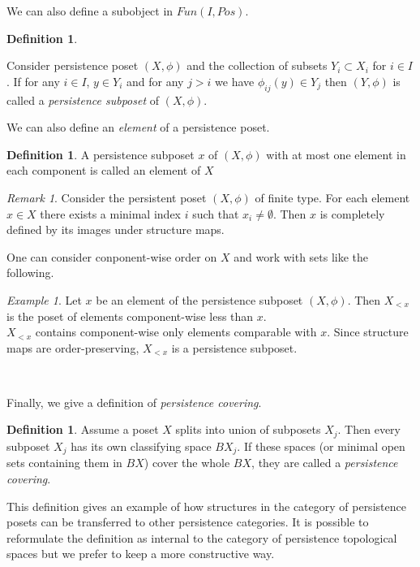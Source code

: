 \documentclass[english,12pt]{article}
\newcounter{stmcounter}[section]
\numberwithin{equation}{section}
\theoremstyle{definition}
\newtheorem{definition}[stmcounter]{Definition}
\theoremstyle{remark}
\newtheorem{remark}[stmcounter]{Remark}
\newtheorem{example}[stmcounter]{Example}
\newcommand{\define}[1]{{\textit{#1}}}
\begin{document}
We can also define a subobject in $Fun(I, Pos)$.

\begin{definition} ~ \par
  Consider persistence poset $(X,\phi)$ and the collection of subsets $Y_i \subset X_i$ for $i \in I$.
  If for any $i \in I$, $y \in Y_i$ and for any $j>i$ we have $\phi_{ij}(y) \in Y_j$ then $(Y,\phi)$ is called a \define{persistence subposet} of $(X,\phi)$.
\end{definition}

We can also define an \define{element} of a persistence poset.
\begin{definition}
  A persistence subposet $x$ of $(X,\phi)$ with at most one element in each component is called an element of $X$
\end{definition}

\begin{remark}
  Consider the persistent poset $(X, \phi)$ of finite type. For each element $x \in X$ there exists a minimal index $i$ such that $x_i \neq \emptyset$. Then $x$ is completely defined by its images under structure maps.
\end{remark}

One can consider conponent-wise order on $X$ and work with sets like the following.
\begin{example}
  Let $x$ be an element of the persistence subposet $(X, \phi)$. Then $X_{<x}$ is the poset of elements component-wise less than $x$.\\

  $X_{<x}$ contains component-wise only elements comparable with $x$. Since structure maps are order-preserving, $X_{<x}$ is a persistence subposet.
\end{example} ~ \par

Finally, we give a definition of \define{persistence covering}.\\

\begin{definition}
  Assume a poset $X$ splits into union of subposets $X_j$. Then every subposet $X_j$ has its own classifying space $BX_j$. If these spaces (or minimal open sets containing them in $BX$) cover the whole $BX$, they are called a \define{persistence covering}.
\end{definition}

This definition gives an example of how structures in the category of persistence posets can be transferred to other persistence categories. It is possible to reformulate the definition as internal to the category of persistence topological spaces but we prefer to keep a more constructive way.
\end{document}
